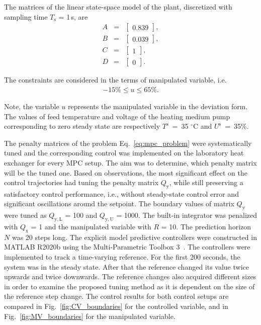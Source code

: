 \documentclass[preprint,12pt]{elsarticle}
\begin{document}
The matrices of the linear state-space model of the plant, discretized with sampling time $T_\mathrm{s}$ = 1\,s, are
\begin{subequations}
	\label{eq:model_A_B} 
	\begin{eqnarray}
		A&=&\begin{bmatrix}
			0.839
		\end{bmatrix}, \\
		B&=&\begin{bmatrix}
			0.039
		\end{bmatrix}, \\
		C&=&\begin{bmatrix}
			1
		\end{bmatrix}, \\
		D&=&\begin{bmatrix}
			0
		\end{bmatrix}.
		\end{eqnarray}
\end{subequations}

The constraints are considered in the terms of manipulated variable, i.e.
\begin{eqnarray}
\label{eq:u_const}
	-15\% \le u \le 65\%.
\end{eqnarray}

Note, the variable $u$ represents the manipulated variable in the deviation form. The values of feed temperature and voltage of the heating medium pump corresponding to zero steady state are respectively $T^\mathrm{s}$~=~35 $^{\circ}\mathrm{C}$ and $U^\mathrm{s}$~=~35\%.

The penalty matrices of the problem Eq.~\eqref{eq:mpc_problem} were systematically tuned and the corresponding control was implemented on the laboratory heat exchanger for every MPC setup. The aim was to determine, which penalty matrix will be the tuned one. Based on observations, the most significant effect on the control trajectories had tuning the penalty matrix $Q_\mathrm{y}$, while still preserving a satisfactory control performance, i.e., without steady-state control error and significant oscillations around the setpoint. The boundary values of matrix $Q_\mathrm{y}$ were tuned as $Q_\mathrm{y, L}$ = 100 and $Q_\mathrm{y, U}$ = 1000. The built-in integrator was penalized with $Q_\mathrm{x}$ = 1 and the manipulated variable with $R$ = 10. The prediction horizon $N$ was 20 steps long. The explicit model predictive controllers were constructed in MATLAB R2020b using the Multi-Parametric Toolbox 3~\cite{mpt_conf}. 
The controllers were implemented to track a time-varying reference. For the first 200 seconds, the system was in the steady state. After that the reference changed its value twice upwards and twice downwards. The reference changes also acquired different sizes in order to examine the proposed tuning method as it is dependent on the size of the reference step change. The control results for both control setups are compared in Fig.~\ref{fig:CV_boundaries} for the controlled variable, and in Fig.~\ref{fig:MV_boundaries} for the manipulated variable.
    
\end{document}
